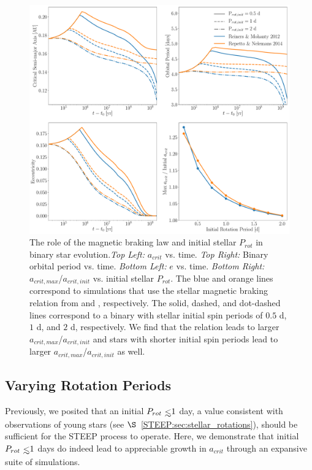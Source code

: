 \begin{figure}
	\includegraphics[width=\columnwidth]{var_MB.pdf}
   \caption{The role of the magnetic braking law and initial stellar $P_{rot}$ in binary star evolution.{\it Top Left:} $a_{crit}$ vs. time.  {\it Top Right:} Binary orbital period vs. time. {\it Bottom Left:} $e$ vs. time. {\it Bottom Right:} $a_{crit,max}$/$a_{crit,init}$ vs. initial stellar $P_{rot}$.  The blue and orange lines correspond to simulations that use the stellar magnetic braking relation from \citet{Reiners2012} and \citet{Repetto2014}, respectively.  The solid, dashed, and dot-dashed lines correspond to a binary with stellar initial spin periods of $0.5$ d, $1$ d, and $2$ d, respectively.  We find that the \citet{Repetto2014} relation leads to larger $a_{crit,max}$/$a_{crit,init}$ and stars with shorter initial spin periods lead to larger $a_{crit,max}$/$a_{crit,init}$ as well.}
    \label{STEEP:fig:var_mb}
\end{figure}

\subsection{Varying Rotation Periods} \label{STEEP:sec:var_rot}

Previously, we posited that an initial $P_{rot} \lsim 1$ day, a value consistent with observations of young stars (see $\S$~\ref{STEEP:sec:stellar_rotations}), should be sufficient for the STEEP process to operate.  Here, we demonstrate that initial $P_{rot} \lsim 1$ days do indeed lead to appreciable growth in $a_{crit}$ through an expansive suite of simulations.

